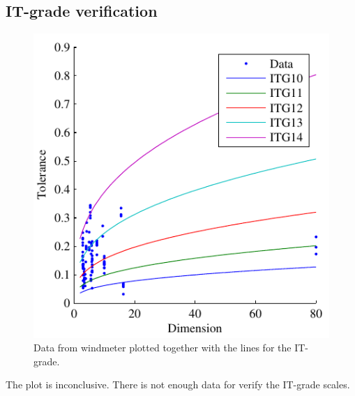 \documentclass[aip,amsmath, reprint, author-year,nobalancelastpage]{revtex4-1}
\begin{document}
\subsection{IT-grade verification}
\begin{figure}[H]
\includegraphics{DimTol.pdf}
\caption{\label{fig:dimtol} Data from windmeter plotted together with the lines for the IT-grade. }
\end{figure}

The plot is inconclusive. There is not enough data for verify the IT-grade scales.


\newpage
\end{document}
